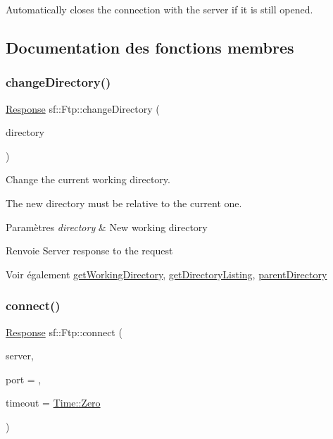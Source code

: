 Automatically closes the connection with the server if it is still opened. 

\subsection{Documentation des fonctions membres}
\mbox{\label{classsf_1_1Ftp_a7e93488ea6330dd4dd76e428da9bb6d3}} 
\subsubsection{\texorpdfstring{change\+Directory()}{changeDirectory()}}
{\footnotesize\ttfamily \hyperlink{classsf_1_1Ftp_1_1Response}{Response} sf\+::\+Ftp\+::change\+Directory (\begin{DoxyParamCaption}\item[{const std\+::string \&}]{directory }\end{DoxyParamCaption})}



Change the current working directory. 

The new directory must be relative to the current one.


\begin{DoxyParams}{Paramètres}
{\em directory} & New working directory\\
\hline
\end{DoxyParams}
\begin{DoxyReturn}{Renvoie}
Server response to the request
\end{DoxyReturn}
\begin{DoxySeeAlso}{Voir également}
\hyperlink{classsf_1_1Ftp_a79c654fcdd0c81e68c4fa29af3b45e0c}{get\+Working\+Directory}, \hyperlink{classsf_1_1Ftp_a8f37258e461fcb9e2a0655e9df0be4a0}{get\+Directory\+Listing}, \hyperlink{classsf_1_1Ftp_ad295cf77f30f9ad07b5c401fd9849189}{parent\+Directory} 
\end{DoxySeeAlso}
\mbox{\label{classsf_1_1Ftp_af02fb3de3f450a50a27981961c69c860}} 
\subsubsection{\texorpdfstring{connect()}{connect()}}
{\footnotesize\ttfamily \hyperlink{classsf_1_1Ftp_1_1Response}{Response} sf\+::\+Ftp\+::connect (\begin{DoxyParamCaption}\item[{const \hyperlink{classsf_1_1IpAddress}{Ip\+Address} \&}]{server,  }\item[{unsigned short}]{port = {},  }\item[{\hyperlink{classsf_1_1Time}{Time}}]{timeout = {\ttfamily \hyperlink{classsf_1_1Time_a8db127b632fa8da21550e7282af11fa0}{Time\+::\+Zero}} }\end{DoxyParamCaption})}




